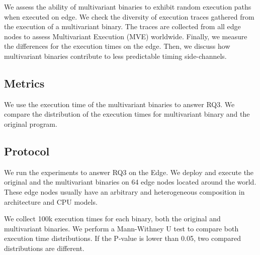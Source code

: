 We assess the ability of multivariant binaries to exhibit random execution paths when executed on edge. We check the diversity of execution traces gathered from the execution of a multivariant binary. The traces are collected from all edge nodes to assess Multivariant Execution (MVE) worldwide. Finally, we measure the differences for the execution times on the edge. Then, we discuss how multivariant binaries contribute to less predictable timing side-channels.

\subsection*{Metrics}

We use the execution time of the multivariant binaries to answer RQ3. We compare the distribution of the execution times for multivariant binary and the original program. 

\subsection*{Protocol}


We run the experiments to answer RQ3 on the Edge. We deploy and execute the original and the multivariant binaries on 64 edge nodes located around the world.
These edge nodes usually have an arbitrary and heterogeneous composition in architecture and CPU models.

We collect 100k execution times for each binary, both the original and multivariant binaries.
We perform a Mann-Withney U test \cite{mann1947} to compare both execution time distributions. 
If the P-value is lower than 0.05, two compared distributions are different.


